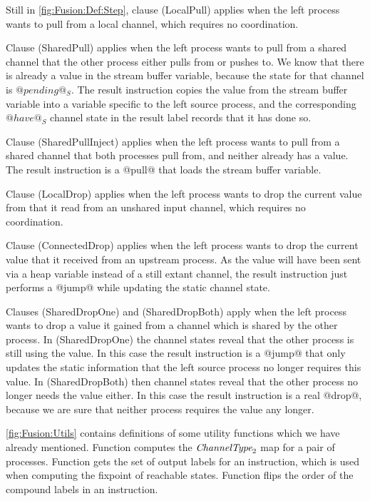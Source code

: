Still in \autoref{fig:Fusion:Def:Step}, clause (LocalPull) applies when the left process wants to pull from a local channel, which requires no coordination.

Clause (SharedPull) applies when the left process wants to pull from a shared channel that the other process either pulls from or pushes to. We know that there is already a value in the stream buffer variable, because the state for that channel is $@pending@_S$. The result instruction copies the value from the stream buffer variable into a variable specific to the left source process, and the corresponding $@have@_S$ channel state in the result label records that it has done so.

Clause (SharedPullInject) applies when the left process wants to pull from a shared channel that both processes pull from, and neither already has a value. The result instruction is a @pull@ that loads the stream buffer variable.

Clause (LocalDrop) applies when the left process wants to drop the current value from that it read from an unshared input channel, which requires no coordination.

Clause (ConnectedDrop) applies when the left process wants to drop the current value that it received from an upstream process. As the value will have been sent via a heap variable instead of a still extant channel, the result instruction just performs a @jump@ while updating the static channel state.

Clauses (SharedDropOne) and (SharedDropBoth) apply when the left process wants to drop a value it gained from a channel which is shared by the other process. In (SharedDropOne) the channel states reveal that the other process is still using the value. In this case the result instruction is a @jump@ that only updates the static information that the left source process no longer requires this value. In (SharedDropBoth) then channel states reveal that the other process no longer needs the value either. In this case the result instruction is a real @drop@, because we are sure that neither process requires the value any longer.




\smallskip
\autoref{fig:Fusion:Utils} contains definitions of some utility functions which we have already mentioned.
Function  computes the $\textit{ChannelType}_2$ map for a pair of processes.
Function  gets the set of output labels for an instruction, which is used when computing the fixpoint of reachable states.
Function  flips the order of the compound labels in an instruction.

